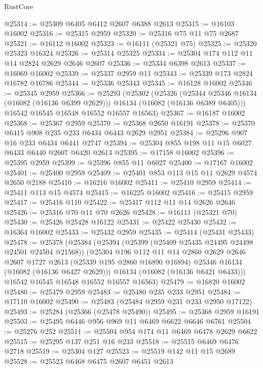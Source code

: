 \begin{lexlean}{RustCore}
\begin{coremodule}
@25314 := @25309 @6405 @6412 @2607 @6388 @2613
@25315 := @16103 @16002
@25316 := @25315 @2959
@25320 := @25316 @75 @11 @75 @2687
@25321 := @16112 @16002
@25323 := @16111 (@25321 @75)
@25325 := @25320 @25323 @16324
@25326 := @25314 @25325
@25334 := @25304 @174 @112 @11 @14 @2824 @2629 @2646 @2607
@25336 := @25334 @6398 @2613
@25337 := @16069 @16002
@25339 := @25337 @2959 @11
@25343 := @25339 @173 @2824 @16782 @16786
@25344 := @25336 @25343
@25345 := @16128 @16002
@25346 := @25345 @2959
@25366 := @25293
    (@25302
      (@25326
        (@25344 @25346 @16134 (@16082 (@16136 @6399 @2629)))
        @16134
        (@16082 (@16136 @6389 @6405)))
      @16542
      @16545
      @16548
      @16552
      @16557
      @16563)
@25367 := @16187 @16002
@25368 := @25367 @2959
@25370 := @25368 @2650 @16191
@25378 := @25370 @6415 @908 @235 @233 @6434 @6443 @2629 @2951
@25384 := @25296 @907 @16 @233 @6434 @6441 @2747
@25394 := @25304 @855 @198 @11 @15 @6027 @6433 @6440 @2607 @6420 @2613
@25395 := @17158 @16002
@25396 := @25395 @2959
@25399 := @25396 @855 @11 @6027
@25400 := @17167 @16002
@25401 := @25400 @2959
@25409 := @25401 @853 @113 @15 @11 @2629 @4574 @2650 @2188
@25410 := @16216 @16002
@25411 := @25410 @2959
@25414 := @25411 @113 @15 @4574
@25415 := @16225 @16002
@25416 := @25415 @2959
@25417 := @25416 @110
@25422 := @25417 @112 @11 @14 @2626 @2646
@25426 := @25316 @70 @11 @70 @2626
@25428 := @16111 (@25321 @70)
@25430 := @25426 @25428 @16122
@25431 := @25422 @25430
@25432 := @16364 @16002
@25433 := @25432 @2959
@25435 := @25414 (@25431 @25433)
@25478 := @25378
    (@25384
      (@25394
        (@25399 (@25409 @25435 @24495 @24498 @24501 @24504 @21568))
        (@25304
          @196
          @112
          @11
          @14
          @2860
          @2629
          @2646
          @2607
          @1727
          @2613
          (@25339 @195 @2860 @16890 @16894)
          @25346
          @16134
          (@16082 (@16136 @6427 @2629)))
        @16134
        (@16082 (@16136 @6421 @6433)))
      @16542
      @16545
      @16548
      @16552
      @16557
      @16563)
@25479 := @16820 @16002
@25480 := @25479 @2959
@25483 := @25480 @235 @233 @2951
@25484 := @17110 @16002
@25490 := @25483 (@25484 @2959 @231 @233 @2950 @17122)
@25493 := @25284 (@25366 (@25478 @25490))
@25495 := @25368 @2959 @16191
@25503 := @25495 @6446 @956 @969 @11 @6469 @6622 @6646 @6761
@25504 := @25276 @252
@25511 := @25504 @954 @174 @11 @6469 @6478 @2629 @6622
@25515 := @25295 @137 @251 @16 @233
@25518 := @25515 @6469 @6476 @2718
@25519 := @25304 @127
@25523 := @25519 @142 @11 @15 @2689
@25528 := @25523 @6468 @6475 @2607 @6451 @2613

\end{coremodule}
\end{lexlean}
